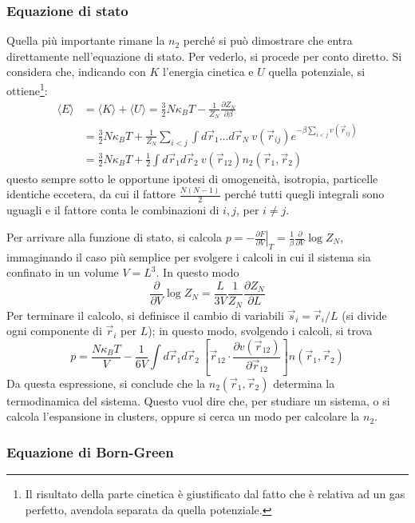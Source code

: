 \documentclass[11pt, a4paper]{scrartcl}
\theoremstyle{style}
\theoremstyle{style1}
\newcommand*\Eval[3]{\left.#1\right\rvert_{#2}^{#3}}
\numberwithin{equation}{subsection}
\begin{document}
\subsubsection{Equazione di stato}

Quella pi\`u importante rimane la $n_2$ perch\'e si pu\`o dimostrare che entra direttamente nell'equazione di stato.
Per vederlo, si procede per conto diretto.
Si considera che, indicando con $K$ l'energia cinetica e $U$ quella potenziale, si ottiene\footnote{Il risultato della parte cinetica \`e giustificato dal fatto che \`e relativa ad un gas perfetto, avendola separata da quella potenziale.}:
\[
	\begin{split}
		\langle E \rangle &= \langle K \rangle + \langle U \rangle= \frac{3}{2}N\kappa _B T - \frac{1}{Z_N}\frac{\partial Z_N}{\partial \beta } \\
				  &= \frac{3}{2}N\kappa _BT + \frac{1}{Z_N}\sum_{i<j}^{} \int d\vec{r}_1 \ldots d\vec{r}_N \ v(\vec{r}_{ij} ) e^{-\beta  \sum_{i<j}^{} v(\vec{r}_{ij}) }\\
				  &= \frac{3}{2}N\kappa _BT + \frac{1}{2} \int d\vec{r}_1 d\vec{r}_2\ v(\vec{r}_{12} ) n_2(\vec{r}_1,\vec{r}_2)
	\end{split}
\] 
questo sempre sotto le opportune ipotesi di omogeneit\`a, isotropia, particelle identiche eccetera, da cui il fattore $\frac{N(N-1)}{2}$ perch\'e tutti quegli integrali sono uguagli e il fattore conta le combinazioni di $i,j$, per $i\neq j$.

Per arrivare alla funzione di stato, si calcola $p = - \Eval{\frac{\partial F}{\partial V} }{T}{}=\frac{1}{\beta }\frac{\partial }{\partial V} \log Z_N$, immaginando il caso pi\`u semplice per svolgere i calcoli in cui il sistema sia confinato in un volume $V = L^3$.
In questo modo
\[
\frac{\partial }{\partial V} \log Z_N = \frac{L}{3V} \frac{1}{Z_N}\frac{\partial Z_N}{\partial L} 
\] 
Per terminare il calcolo, si definisce il cambio di variabili $\vec{s}_{i} = \vec{r}_{i} / L$ (si divide ogni componente di $\vec{r}_{i} $ per $L$); in questo modo, svolgendo i calcoli, si trova 
\[
p = \frac{N\kappa _B T}{V} - \frac{1}{6V} \int d\vec{r}_1 d\vec{r}_2 \ \left[ \vec{r}_{12} \cdot \frac{\partial v(\vec{r}_{12} )}{\partial \vec{r}_{12} }  \right] n (\vec{r}_1,\vec{r}_2)
\] 
Da questa espressione, si conclude che la $n_2(\vec{r}_1, \vec{r}_2)$ determina la termodinamica del sistema.
Questo vuol dire che, per studiare un sistema, o si calcola l'espansione in clusters, oppure si cerca un modo per calcolare la $n_2$.

\subsubsection{Equazione di Born-Green}
\end{document}
